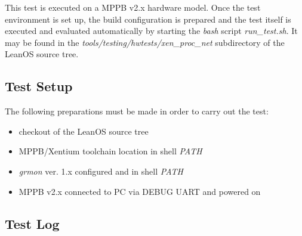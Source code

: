 This test is executed on a \gls{MPPB} v2.x hardware model. Once the test
environment is set up, the build configuration is prepared and the test itself
is executed and evaluated automatically by starting the \emph{bash} script
\emph{run\_test.sh}. It may be found in the 
\mbox{\emph{tools/testing/hwtests/xen\_proc\_net}} subdirectory of the LeanOS
source tree.


\subsection*{Test Setup}

The following preparations must be made in order to carry out the test:

\begin{itemize}
	\item checkout of the LeanOS source tree
	\item \gls{MPPB}/\gls{Xentium} toolchain location in shell \emph{PATH}
	\item \emph{grmon} ver. 1.x configured and in shell \emph{PATH}
	\item \gls{MPPB} v2.x connected to PC via DEBUG UART and powered on
\end{itemize}


\subsection*{Test Log}





